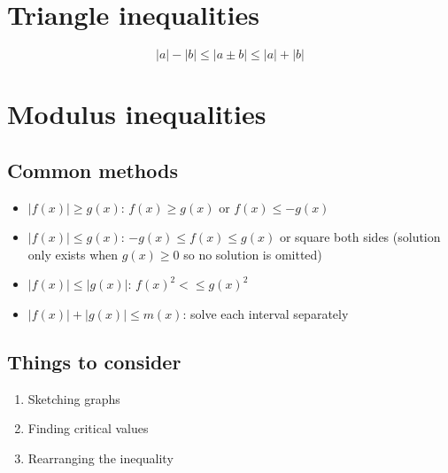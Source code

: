 \section{Triangle inequalities}
$$\left| a \right|-\left| b \right| \leq \left| a\pm b \right| \leq \left| a \right| + \left| b \right|$$


\section{Modulus inequalities}
\subsection{Common methods}
\begin{itemize}
    \item $\left|f(x)\right|\geq g(x)$: $f(x) \geq g(x)$ or $f(x) \leq -g(x)$
    \item $\left|f(x)\right|\leq g(x)$: $-g(x) \leq f(x) \leq g(x)$ or square both sides
          (solution only exists when $g(x) \geq 0$ so no solution is omitted)
    \item $\left|f(x)\right|\leq \left|g(x)\right|$: $f(x)^2 < \leq g(x)^2$
    \item $\left|f(x)\right| + \left|g(x)\right| \leq m(x)$: solve each interval separately
\end{itemize}

\subsection{Things to consider}
\begin{enumerate}
    \item Sketching graphs
    \item Finding critical values
    \item Rearranging the inequality
\end{enumerate}